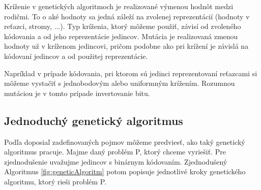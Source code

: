 Kríženie v genetických algoritmoch je realizované výmenou hodnôt medzi rodičmi. To o aké hodnoty sa jedná záleží na zvolenej reprezentácií (hodnoty v reťazci, stromy, ...). Typ kríženia, ktorý môžeme použiť, závisí od zvoleného kódovania a od jeho reprezentácie jedincov. 
Mutácia je realizovaná zmenou hodnoty už v kríženom jedincovi, pričom podobne ako pri krížení je závislá na kódovaní jedincov a od použitej reprezentácie. 

Napríklad v prípade kódovania, pri ktorom sú jedinci reprezentovaní reťazcami si môžeme vystačiť s jednobodovým alebo uniformným krížením. Rozumnou mutáciou je v tomto prípade invertovanie bitu.

\subsection{Jednoduchý genetický algoritmus}\label{kap2:2.1:2.1.3:SimpleGeneticAlgo}
Podľa doposiaľ zadefinovaných pojmov môžeme predviesť, ako taký genetický algoritmus pracuje. Majme daný problém P, ktorý chceme vyriešiť. Pre zjednodušenie uvažujme jedincov s binárnym kódovaním. Zjednodušený Algoritmus \ref{fig:geneticAlgoritm} potom popisuje jednotlivé kroky genetického algoritmu, ktorý rieši problém P.
